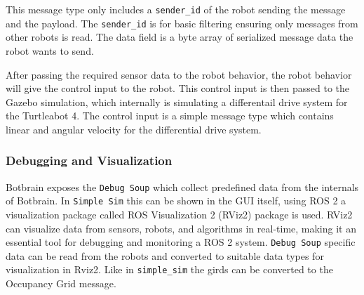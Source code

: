 This message type only includes a \texttt{sender\_id} of the robot sending the message and the payload. The \texttt{sender\_id} is for basic filtering ensuring only messages from other robots is read.
The data field is a byte array of serialized message data the robot wants to send.

After passing the required sensor data to the robot behavior, the robot behavior will give the control input to the robot. This control input is then passed to the Gazebo simulation, which internally is simulating a differentail drive system for the Turtleabot 4. The control input is a simple message type which contains linear and angular velocity for the differential drive system.

\subsubsection{Debugging and Visualization}\label{sec:debugging_rviz}
Botbrain exposes the \texttt{Debug Soup} which collect predefined data from the internals of Botbrain. 
In \texttt{Simple Sim} this can be shown in the GUI itself, using ROS 2 a visualization package called ROS Visualization 2 (RViz2) package is used.
RViz2 can visualize data from sensors, robots, and algorithms in real-time, making it an essential tool for debugging and monitoring a ROS 2 system.
\texttt{Debug Soup} specific data can be read from the robots and converted to suitable data types for visualization in Rviz2. Like in \texttt{simple\_sim} the girds can be converted to the Occupancy Grid message.
